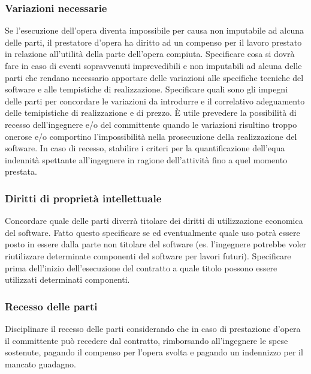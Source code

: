 \subsubsection{Variazioni necessarie}
Se l'esecuzione dell'opera diventa impossibile per causa non imputabile ad alcuna delle parti, il prestatore d'opera ha diritto ad un compenso per il lavoro
prestato in relazione all'utilità della parte dell'opera compiuta.\newline
Specificare cosa si dovrà fare in caso di eventi sopravvenuti imprevedibili e non imputabili ad alcuna delle parti che rendano necessario apportare delle variazioni
alle specifiche tecniche del software e alle tempistiche di realizzazione.\newline
Specificare quali sono gli impegni delle parti per concordare le variazioni da introdurre e il correlativo adeguamento
delle temipistiche di realizzazione e di prezzo.
È utile prevedere la possibilità di recesso dell'ingegnere e/o del committente quando le
variazioni risultino troppo onerose e/o comportino l'impossibilità nella prosecuzione della
realizzazione del software.\newline
In caso di recesso, stabilire i criteri per la quantificazione dell'equa indennità spettante all'ingegnere in ragione dell'attività
fino a quel momento prestata.

\subsubsection{Diritti di proprietà intellettuale}
Concordare quale delle parti diverrà titolare dei diritti di utilizzazione economica del software. Fatto questo specificare
se ed eventualmente quale uso potrà essere posto in essere dalla parte non titolare del software (es. l'ingegnere potrebbe
voler riutilizzare determinate componenti del software per lavori futuri). Specificare prima dell'inizio dell'esecuzione del contratto
a quale titolo possono essere utilizzati determinati componenti.

\subsubsection{Recesso delle parti}
Disciplinare il recesso delle parti considerando che in caso di prestazione d'opera il committente può
recedere dal contratto, rimborsando all'ingegnere le spese sostenute, pagando il compenso per l'opera svolta
e pagando un indennizzo per il mancato guadagno.

